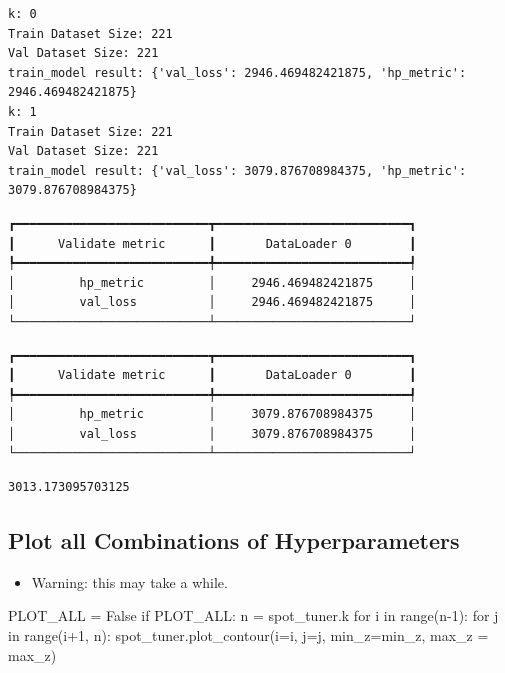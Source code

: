 \documentclass[
  letterpaper,
  DIV=11,
  numbers=noendperiod]{scrreprt}
\newenvironment{Shaded}{\begin{snugshade}}{\end{snugshade}}
\newcommand{\BuiltInTok}[1]{\textcolor[rgb]{0.00,0.23,0.31}{#1}}
\newcommand{\ControlFlowTok}[1]{\textcolor[rgb]{0.00,0.23,0.31}{#1}}
\newcommand{\DecValTok}[1]{\textcolor[rgb]{0.68,0.00,0.00}{#1}}
\newcommand{\KeywordTok}[1]{\textcolor[rgb]{0.00,0.23,0.31}{#1}}
\newcommand{\NormalTok}[1]{\textcolor[rgb]{0.00,0.23,0.31}{#1}}
\newcommand{\OperatorTok}[1]{\textcolor[rgb]{0.37,0.37,0.37}{#1}}
\newcommand{\VariableTok}[1]{\textcolor[rgb]{0.07,0.07,0.07}{#1}}
\providecommand{\tightlist}{%
  \setlength{\itemsep}{0pt}\setlength{\parskip}{0pt}}\usepackage{longtable,booktabs,array}
\begin{document}
\begin{verbatim}
k: 0
Train Dataset Size: 221
Val Dataset Size: 221
train_model result: {'val_loss': 2946.469482421875, 'hp_metric': 2946.469482421875}
k: 1
Train Dataset Size: 221
Val Dataset Size: 221
train_model result: {'val_loss': 3079.876708984375, 'hp_metric': 3079.876708984375}
\end{verbatim}

\begin{verbatim}
┏━━━━━━━━━━━━━━━━━━━━━━━━━━━┳━━━━━━━━━━━━━━━━━━━━━━━━━━━┓
┃      Validate metric      ┃       DataLoader 0        ┃
┡━━━━━━━━━━━━━━━━━━━━━━━━━━━╇━━━━━━━━━━━━━━━━━━━━━━━━━━━┩
│         hp_metric         │     2946.469482421875     │
│         val_loss          │     2946.469482421875     │
└───────────────────────────┴───────────────────────────┘
\end{verbatim}

\begin{verbatim}
┏━━━━━━━━━━━━━━━━━━━━━━━━━━━┳━━━━━━━━━━━━━━━━━━━━━━━━━━━┓
┃      Validate metric      ┃       DataLoader 0        ┃
┡━━━━━━━━━━━━━━━━━━━━━━━━━━━╇━━━━━━━━━━━━━━━━━━━━━━━━━━━┩
│         hp_metric         │     3079.876708984375     │
│         val_loss          │     3079.876708984375     │
└───────────────────────────┴───────────────────────────┘
\end{verbatim}

\begin{verbatim}
3013.173095703125
\end{verbatim}

\subsection{Plot all Combinations of
Hyperparameters}\label{plot-all-combinations-of-hyperparameters-3}

\begin{itemize}
\tightlist
\item
  Warning: this may take a while.
\end{itemize}

\begin{Shaded}
\begin{Highlighting}[]
\NormalTok{PLOT\_ALL }\OperatorTok{=} \VariableTok{False}
\ControlFlowTok{if}\NormalTok{ PLOT\_ALL:}
\NormalTok{    n }\OperatorTok{=}\NormalTok{ spot\_tuner.k}
    \ControlFlowTok{for}\NormalTok{ i }\KeywordTok{in} \BuiltInTok{range}\NormalTok{(n}\OperatorTok{{-}}\DecValTok{1}\NormalTok{):}
        \ControlFlowTok{for}\NormalTok{ j }\KeywordTok{in} \BuiltInTok{range}\NormalTok{(i}\OperatorTok{+}\DecValTok{1}\NormalTok{, n):}
\NormalTok{            spot\_tuner.plot\_contour(i}\OperatorTok{=}\NormalTok{i, j}\OperatorTok{=}\NormalTok{j, min\_z}\OperatorTok{=}\NormalTok{min\_z, max\_z }\OperatorTok{=}\NormalTok{ max\_z)}
\end{Highlighting}
\end{Shaded}
\end{document}
